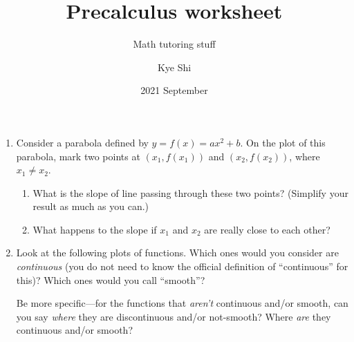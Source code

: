 \documentclass{ks}
\title{Precalculus worksheet}
\subtitle{Math tutoring stuff}
\author{Kye Shi}
\date{2021 September}
\begin{document}
\begin{enumerate}

  \item Consider a parabola defined by \(y = f(x) = ax^2 + b\).  On the plot of
    this parabola, mark two points at \((x_1, f(x_1))\) and \((x_2, f(x_2))\),
    where \(x_1 \ne x_2\).

    \begin{center}
    \end{center}

    \begin{enumerate}
      \item What is the slope of line passing through these two points?
        (Simplify your result as much as you can.)
      \item What happens to the slope if \(x_1\) and \(x_2\) are really close
        to each other?
    \end{enumerate}

  \item Look at the following plots of functions.  Which ones would you consider
    are \emph{continuous} (you do not need to know the official definition of
    ``continuous'' for this)?  Which ones would you call ``smooth''?

    Be more specific---for the functions that \emph{aren't} continuous and/or
    smooth, can you say \emph{where} they are discontinuous and/or not-smooth?
    Where \emph{are} they continuous and/or smooth?



\end{enumerate}
\end{document}
